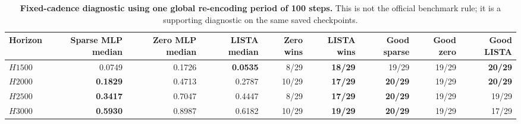 \begin{table}[ht]
\centering
\scriptsize
\setlength{\tabcolsep}{5pt}
\begin{tabular}{lrrrrrrrr}
\toprule
Horizon & Sparse MLP median & Zero MLP median & LISTA median & Zero wins & LISTA wins & Good sparse & Good zero & Good LISTA \\
\midrule
$H1500$ & 0.0749 & 0.1726 & \textbf{0.0535} & 8/29 & \textbf{18/29} & 19/29 & 19/29 & \textbf{20/29} \\
$H2000$ & \textbf{0.1829} & 0.4713 & 0.2787 & 10/29 & \textbf{17/29} & \textbf{20/29} & 19/29 & \textbf{20/29} \\
$H2500$ & \textbf{0.3417} & 0.7047 & 0.4447 & 8/29 & \textbf{17/29} & \textbf{20/29} & 19/29 & 19/29 \\
$H3000$ & \textbf{0.5930} & 0.8987 & 0.6182 & 10/29 & \textbf{19/29} & \textbf{20/29} & 19/29 & 17/29 \\
\bottomrule
\end{tabular}
\caption{\textbf{Fixed-cadence diagnostic using one global re-encoding period of 100 steps.} This is not the official benchmark rule; it is a supporting diagnostic on the same saved checkpoints.}
\label{tab:review-cross-system-fixed-cadence-20260314}
\end{table}




